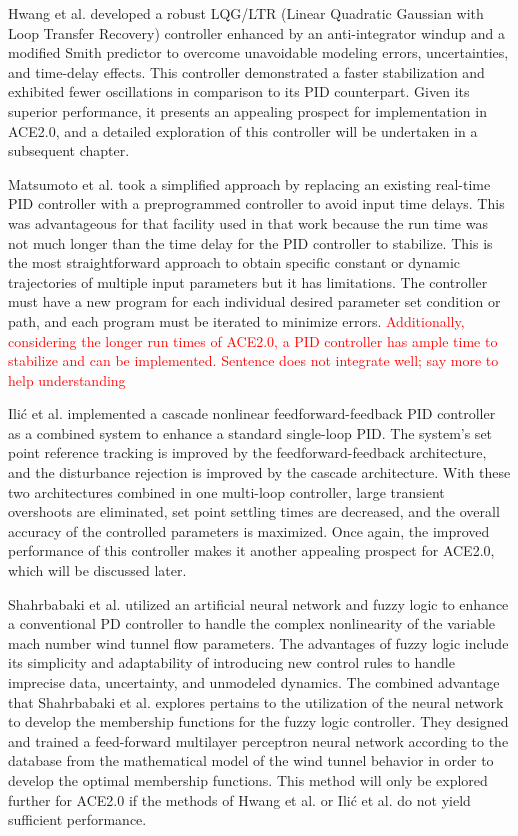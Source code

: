 Hwang et al. \cite{hwang} developed a robust LQG/LTR (Linear Quadratic Gaussian with Loop Transfer Recovery) controller enhanced by an anti-integrator windup and a modified Smith predictor to overcome unavoidable modeling errors, uncertainties, and time-delay effects. This controller demonstrated a faster stabilization and exhibited fewer oscillations in comparison to its PID counterpart. Given its superior performance, it presents an appealing prospect for implementation in ACE2.0, and a detailed exploration of this controller will be undertaken in a subsequent chapter.

Matsumoto et al. \cite{matsumoto} took a simplified approach by replacing an existing real-time PID controller with a preprogrammed controller to avoid input time delays. This was advantageous for that facility used in that work because the run time was not much longer than the time delay for the PID controller to stabilize. This is the most straightforward approach to obtain specific constant or dynamic trajectories of multiple input parameters but it has limitations. The controller must have a new program for each individual desired parameter set condition or path, and each program must be iterated to minimize errors. \textcolor{red}{Additionally, considering the longer run times of ACE2.0, a PID controller has ample time to stabilize and can be implemented. Sentence does not integrate well; say more to help understanding}

Ili\'c et al. \cite{ilic-2} implemented a cascade nonlinear feedforward-feedback PID controller as a combined system to enhance a standard single-loop PID. The system's set point reference tracking is improved by the feedforward-feedback architecture, and the disturbance rejection is improved by the cascade architecture. With these two architectures combined in one multi-loop controller, large transient overshoots are eliminated, set point settling times are decreased, and the overall accuracy of the controlled parameters is maximized. Once again, the improved performance of this controller makes it another appealing prospect for ACE2.0, which will be discussed later.

Shahrbabaki et al. \cite{shahrbabaki-1} utilized an artificial neural network and fuzzy logic to enhance a conventional PD controller to handle the complex nonlinearity of the variable mach number wind tunnel flow parameters. The advantages of fuzzy logic include its simplicity and adaptability of introducing new control rules to handle imprecise data, uncertainty, and unmodeled dynamics. The combined advantage that Shahrbabaki et al. explores pertains to the utilization of the neural network to develop the membership functions for the fuzzy logic controller. They designed and trained a feed-forward multilayer perceptron neural network according to the database from the mathematical model of the wind tunnel behavior in order to develop the optimal membership functions. This method will only be explored further for ACE2.0 if the methods of Hwang et al. or Ili\'c et al. do not yield sufficient performance.


